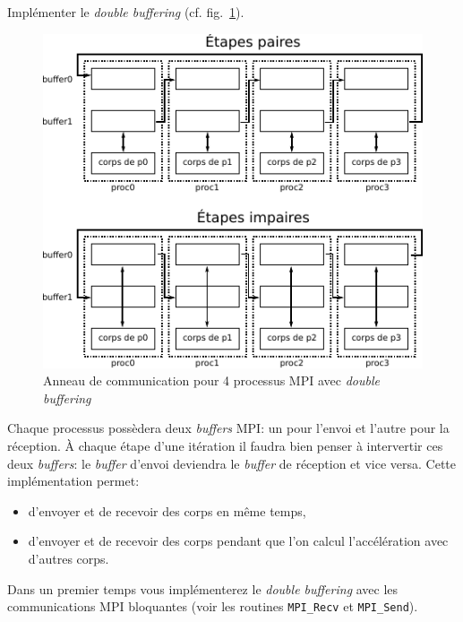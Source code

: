 \begin{questions}
	\question Implémenter le \textit{double buffering} (cf. fig.~\ref{fig:anneauDB}).
	\begin{figure}[htbp]
		\centering
		\includegraphics[width=0.65\linewidth]{schemas/anneau_avec_buffering.pdf}
		\caption{Anneau de communication pour 4 processus MPI avec \textit{double buffering}}
		\label{fig:anneauDB}
	\end{figure}
	\begin{solution}
		Chaque processus possèdera deux \textit{buffers} MPI: un pour l'envoi et l'autre pour la réception.
		À chaque étape d'une itération il faudra bien penser à intervertir ces deux \textit{buffers}: le \textit{buffer} d'envoi deviendra le \textit{buffer} de réception et vice versa.
		Cette implémentation permet:
		\begin{itemize}
			\item d'envoyer et de recevoir des corps en même temps,
			\item d'envoyer et de recevoir des corps pendant que l'on calcul l'accélération avec d'autres corps.
		\end{itemize}
		Dans un premier temps vous implémenterez le \textit{double buffering} avec les communications MPI bloquantes (voir les routines \texttt{MPI\_Recv} et \texttt{MPI\_Send}).
	\end{solution}


\end{questions}
